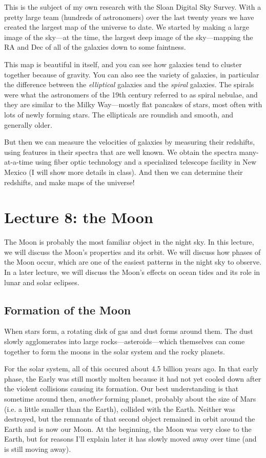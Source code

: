 \documentclass[12pt, preprint]{aastex}
\begin{document}
This is the subject of my own research with the Sloan Digital Sky
Survey. With a pretty large team (hundreds of astronomers) over the
last twenty years we have created the largest map of the universe to
date. We started by making a large image of the sky---at the time, the
largest deep image of the sky---mapping the RA and Dec of all of the
galaxies down to some faintness.

This map is beautiful in itself, and you can see how galaxies tend to
cluster together because of gravity. You can also see the variety of
galaxies, in particular the difference between the {\it elliptical}
galaxies and the {\it spiral} galaxies. The spirals were what the
astronomers of the 19th century referred to as spiral nebulae, and
they are similar to the Milky Way---mostly flat pancakes of stars,
most often with lots of newly forming stars. The ellipticals are
roundish and smooth, and generally older.

But then we can measure the velocities of galaxies by measuring their
redshifts, using features in their spectra that are well known. We
obtain the spectra many-at-a-time using fiber optic technology and a
specialized telescope facility in New Mexico (I will show more details
in class). And then we can determine their redshifts, and make maps of
the universe!

\clearpage
\section{Lecture 8: the Moon}

The Moon is probably the most familiar object in the night sky. In
this lecture, we will discuss the Moon's properties and its orbit. We
will discuss how phases of the Moon occur, which are one of the
easiest patterns in the night sky to observe. In a later lecture, we
will discuss the Moon's effects on ocean tides and its role in lunar
and solar eclipses.

\subsection{Formation of the Moon}

When stars form, a rotating disk of gas and dust forms around
them. The dust slowly agglomerates into large
rocks---asteroids---which themselves can come together to form the
moons in the solar system and the rocky planets.

For the solar system, all of this occured about 4.5 billion years
ago. In that early phase, the Early was still mostly molten because it
had not yet cooled down after the violent collisions causing its
formation. Our best understanding is that sometime around then, {\it
  another} forming planet, probably about the size of Mars (i.e. a
little smaller than the Earth), collided with the Earth. Neither was
destroyed, but the remnants of that second object remained in orbit
around the Earth and is now our Moon. At the beginning, the Moon was
very close to the Earth, but for reasons I'll explain later it has
slowly moved away over time (and is still moving away).
\end{document}
